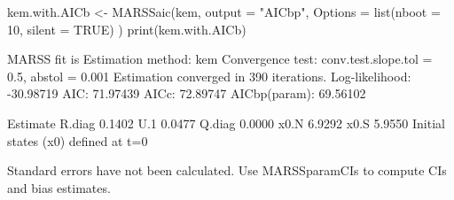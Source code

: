 \begin{Schunk}
\begin{Sinput}
 kem.with.AICb <- MARSSaic(kem,
   output = "AICbp",
   Options = list(nboot = 10, silent = TRUE)
 )
 print(kem.with.AICb)
\end{Sinput}
\begin{Soutput}
MARSS fit is
Estimation method: kem 
Convergence test: conv.test.slope.tol = 0.5, abstol = 0.001
Estimation converged in 390 iterations. 
Log-likelihood: -30.98719 
AIC: 71.97439   AICc: 72.89747   AICbp(param): 69.56102   
 
       Estimate
R.diag   0.1402
U.1      0.0477
Q.diag   0.0000
x0.N     6.9292
x0.S     5.9550
Initial states (x0) defined at t=0

Standard errors have not been calculated. 
Use MARSSparamCIs to compute CIs and bias estimates.
\end{Soutput}
\end{Schunk}
